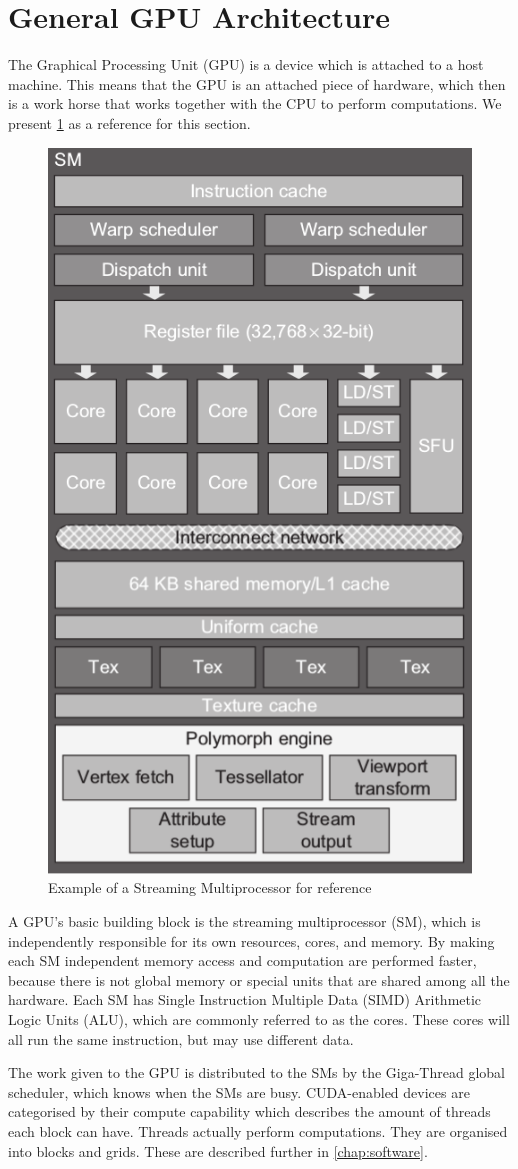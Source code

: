 \section{General GPU Architecture}
\label{sec:gpu}

The Graphical Processing Unit (GPU) is a device which is attached to a host machine.
This means that the GPU is an attached piece of hardware, which then is a work horse that works together with the CPU to perform computations.
We present \cref{fig:sm example} as a reference for this section.

\begin{figure}[htb]
  \centering
  \includegraphics[width=.5\textwidth]{graphics/images/cropped-cuda-sm.png}
  \caption{Example of a Streaming Multiprocessor for reference~\cite{farber2011cuda}}
  \label{fig:sm example}
\end{figure}

A GPU's basic building block is the streaming multiprocessor (SM), which is independently responsible for its own resources, cores, and memory.
By making each SM independent memory access and computation are performed faster, because there is not global memory or special units that are shared among all the hardware.
Each SM has Single Instruction Multiple Data (SIMD) Arithmetic Logic Units (ALU), which are commonly referred to as the cores.
These cores will all run the same instruction, but may use different data.

The work given to the GPU is distributed to the SMs by the Giga-Thread global scheduler, which knows when the SMs are busy.
CUDA-enabled devices are categorised by their compute capability which describes the amount of threads each block can have.
Threads actually perform computations.
They are organised into blocks and grids.
These are described further in \cref{chap:software}.


